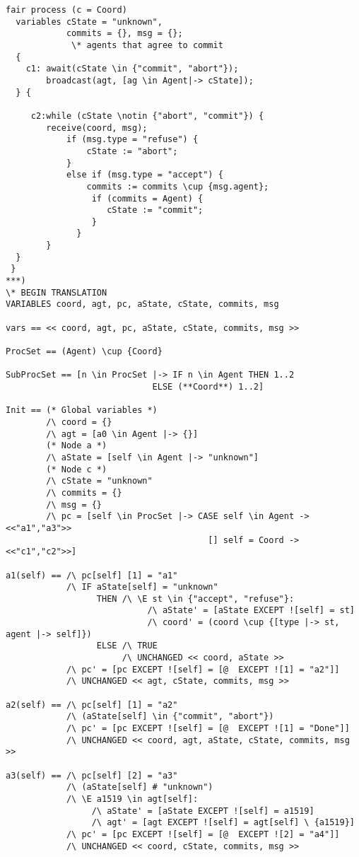 \documentclass{thesul}
\begin{document}
\begin{appendices}
\begin{lstlisting}[caption = TLA+ translation for Sub-Processes, frame = tlrb, firstnumber = 1]
  fair process (c = Coord) 
  variables cState = "unknown",
            commits = {}, msg = {};
             \* agents that agree to commit
  {
    c1: await(cState \in {"commit", "abort"});    
        broadcast(agt, [ag \in Agent|-> cState]);
  } {
        
     c2:while (cState \notin {"abort", "commit"}) {
        receive(coord, msg);
            if (msg.type = "refuse") {
                cState := "abort";
            }
            else if (msg.type = "accept") {
                commits := commits \cup {msg.agent};
                 if (commits = Agent) {
                    cState := "commit";
                 }
              }
        }
  }
 }
***)
\* BEGIN TRANSLATION
VARIABLES coord, agt, pc, aState, cState, commits, msg

vars == << coord, agt, pc, aState, cState, commits, msg >>

ProcSet == (Agent) \cup {Coord}

SubProcSet == [n \in ProcSet |-> IF n \in Agent THEN 1..2
                             ELSE (**Coord**) 1..2]

Init == (* Global variables *)
        /\ coord = {}
        /\ agt = [a0 \in Agent |-> {}]
        (* Node a *)
        /\ aState = [self \in Agent |-> "unknown"]
        (* Node c *)
        /\ cState = "unknown"
        /\ commits = {}
        /\ msg = {}
        /\ pc = [self \in ProcSet |-> CASE self \in Agent -> <<"a1","a3">>
                                        [] self = Coord -> <<"c1","c2">>]

a1(self) == /\ pc[self] [1] = "a1"
            /\ IF aState[self] = "unknown"
                  THEN /\ \E st \in {"accept", "refuse"}:
                            /\ aState' = [aState EXCEPT ![self] = st]
                            /\ coord' = (coord \cup {[type |-> st, agent |-> self]})
                  ELSE /\ TRUE
                       /\ UNCHANGED << coord, aState >>
            /\ pc' = [pc EXCEPT ![self] = [@  EXCEPT ![1] = "a2"]]
            /\ UNCHANGED << agt, cState, commits, msg >>

a2(self) == /\ pc[self] [1] = "a2"
            /\ (aState[self] \in {"commit", "abort"})
            /\ pc' = [pc EXCEPT ![self] = [@  EXCEPT ![1] = "Done"]]
            /\ UNCHANGED << coord, agt, aState, cState, commits, msg >>

a3(self) == /\ pc[self] [2] = "a3"
            /\ (aState[self] # "unknown")
            /\ \E a1519 \in agt[self]:
                 /\ aState' = [aState EXCEPT ![self] = a1519]
                 /\ agt' = [agt EXCEPT ![self] = agt[self] \ {a1519}]
            /\ pc' = [pc EXCEPT ![self] = [@  EXCEPT ![2] = "a4"]]
            /\ UNCHANGED << coord, cState, commits, msg >>


\end{lstlisting}
\end{appendices}
\end{document}
